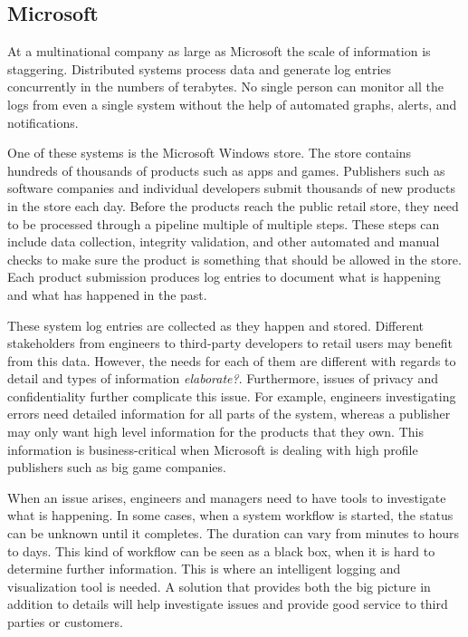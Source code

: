 \documentclass[english,12pt,a4paper,pdftex,sci,utf8]{aaltothesis}
\newcommand{\nyi}[1]{\colorbox{nyibg}{\textcolor{nyitext}{\emph{#1}}}\PackageWarning{NYI}{#1}}
\begin{document}
\subsection{Microsoft}
At a multinational company as large as Microsoft the scale of information is staggering.
Distributed systems process data and generate log entries concurrently in the numbers of terabytes.
No single person can monitor all the logs from even a single system without the help of automated
graphs, alerts, and notifications.  

One of these systems is the Microsoft Windows store. The store contains hundreds of thousands of products
such as apps and games. Publishers such as software companies and individual developers submit thousands of 
new products in the store each day. Before the products reach the public retail store, they need to be processed
through a pipeline multiple of multiple steps. These steps can include data collection, integrity validation, and
other automated and manual checks to make sure the product is something that should be allowed in the store.
Each product submission produces log entries to document what is happening and what has happened in the past.

These system log entries are collected as they happen and stored. Different stakeholders from engineers to third-party developers to retail users may benefit from this data. However, the needs for each of them are
different with regards to detail and types of information \nyi{elaborate?}. Furthermore, issues of privacy and 
confidentiality further complicate this issue.
For example, engineers investigating errors need detailed information for all parts of the system, whereas a 
publisher may only want high level information for the products that they own.
This information is business-critical when Microsoft is dealing with high profile publishers such as big game companies.

When an issue arises, engineers and managers need to have tools to investigate what is happening. 
In some cases, when a system workflow is started, the status can be unknown until it completes.
The duration can vary from minutes to hours to days. This kind of workflow can be seen as a black box,
when it is hard to determine further information. This is where an intelligent logging and visualization tool is 
needed. A solution that provides both the big picture in addition to details will help investigate issues and
provide good service to third parties or customers.
\end{document}
